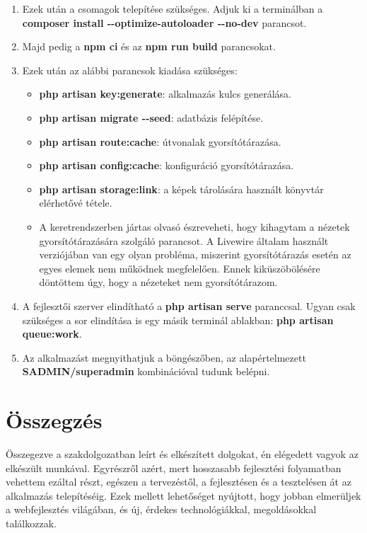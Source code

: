 \documentclass[
]{thesis-ekf}
\theoremstyle{definition}
\theoremstyle{remark}
\begin{document}
\begin{enumerate}
	\item Ezek után a csomagok telepítése szükséges. Adjuk ki a terminálban a \textbf{composer install -\/-optimize-autoloader -\/-no-dev} parancsot.
	\item Majd pedig a \textbf{npm ci} és az \textbf{npm run build} parancsokat.
	\item Ezek után az alábbi parancsok kiadása szükséges:
	\begin{itemize}
		\item \textbf{php artisan key:generate}: alkalmazás kulcs generálása.
		\item \textbf{php artisan migrate -\/-seed}: adatbázis felépítése.
		\item \textbf{php artisan route:cache}: útvonalak gyorsítótárazása.
		\item \textbf{php artisan config:cache}: konfiguráció gyorsítótárazása.
		\item \textbf{php artisan storage:link}: a képek tárolására használt könyvtár elérhetővé tétele.
		\item A keretrendszerben jártas olvasó észreveheti, hogy kihagytam a nézetek gyorsítótárazására szolgáló parancsot. A Livewire általam használt verziójában van egy olyan probléma, miszerint gyorsítótárazás esetén az egyes elemek nem működnek megfelelően. Ennek kiküszöbölésére döntöttem úgy, hogy a nézeteket nem gyorsítótárazom.
	\end{itemize}
	\item A fejlesztői szerver elindítható a \textbf{php artisan serve} paranccsal. Ugyan csak szükséges a sor elindítása is egy másik terminál ablakban: \textbf{php artisan queue:work}.
	\item Az alkalmazást megnyithatjuk a böngészőben, az alapértelmezett \textbf{SADMIN/superadmin} kombinációval tudunk belépni.
\end{enumerate}

\chapter*{Összegzés}

Összegezve a szakdolgozatban leírt és elkészített dolgokat, én elégedett vagyok az elkészült munkával. Egyrészről azért, mert hosszasabb fejlesztési folyamatban vehettem ezáltal részt, egészen a tervezéstől, a fejlesztésen és a tesztelésen át az alkalmazás telepítéséig. Ezek mellett lehetőséget nyújtott, hogy jobban elmerüljek a webfejlesztés világában, és új, érdekes technológiákkal, megoldásokkal találkozzak.
\end{document}
